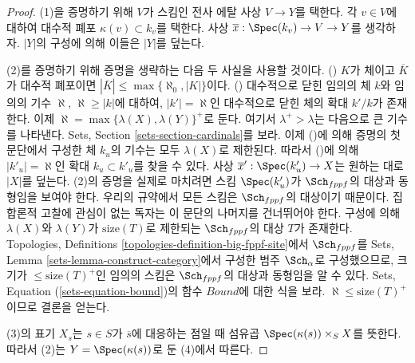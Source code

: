 \begin{proof}
(1)을 증명하기 위해 $V$가 스킴인 전사 에탈 사상 $V \to Y$를 택한다.
각 $v \in V$에 대하여 대수적 폐포
$\kappa(v) \subset k_v$를 택한다. 사상
$\overline{x} : \Spec(k_v) \to V \to Y$를 생각하자.
$|Y|$의 구성에 의해 이들은 $|Y|$를 덮는다.

\medskip\noindent
(2)를 증명하기 위해 증명을 생략하는 다음 두 사실을 사용할 것이다.
() $K$가 체이고 $\overline{K}$가 대수적 폐포이면
$|\overline{K}| \leq \max\{\aleph_0, |K|\}$이다.
() 대수적으로 닫힌 임의의 체 $k$와 임의의 기수
$\aleph$, $\aleph \geq |k|$에 대하여, $|k'| = \aleph$인
대수적으로 닫힌 체의 확대 $k'/k$가 존재한다.
이제 $\aleph = \max\{\lambda(X), \lambda(Y)\}^+$로 둔다.
여기서 $\lambda^+ > \lambda$는 다음으로 큰 기수를 나타낸다.
Sets, Section \ref{sets-section-cardinals}를 보라.
이제 ()에 의해 증명의 첫 문단에서 구성한 체 $k_u$의
기수는 모두 $\lambda(X)$로 제한된다. 따라서 ()에 의해
$|k'_u| = \aleph$인 확대 $k_u \subset k'_u$를 찾을 수 있다. 사상
$\overline{x}' : \Spec(k'_u) \to X$는 원하는 대로 $|X|$를 덮는다.
(2)의 증명을 실제로 마치려면 스킴 $\Spec(k'_u)$가
$\Sch_{fppf}$의 대상과 동형임을 보여야 한다. 우리의 규약에서
모든 스킴은 $\Sch_{fppf}$의 대상이기 때문이다. 집합론적 고찰에
관심이 없는 독자는 이 문단의 나머지를 건너뛰어야 한다.
구성에 의해 $\lambda(X)$와 $\lambda(Y)$가 $\text{size}(T)$로
제한되는 $\Sch_{fppf}$의 대상 $T$가 존재한다.
Topologies, Definitions \ref{topologies-definition-big-fppf-site}에서
$\Sch_{fppf}$를 Sets, Lemma \ref{sets-lemma-construct-category}에서
구성한 범주 $\Sch_\alpha$로 구성했으므로, 크기가
$\leq \text{size}(T)^+$인 임의의 스킴은 $\Sch_{fppf}$의 대상과
동형임을 알 수 있다. Sets, Equation
(\ref{sets-equation-bound})의 함수 $Bound$에 대한 식을 보라.
$\aleph \leq \text{size}(T)^+$이므로 결론을 얻는다.

\medskip\noindent
(3)의 표기 $X_s$는 $s \in S$가 $\overline{s}$에 대응하는 점일 때
섬유곱 $\Spec(\kappa(s)) \times_S X$를 뜻한다. 따라서 (2)는
$Y = \Spec(\kappa(s))$로 둔 (4)에서 따른다.


\end{proof}
